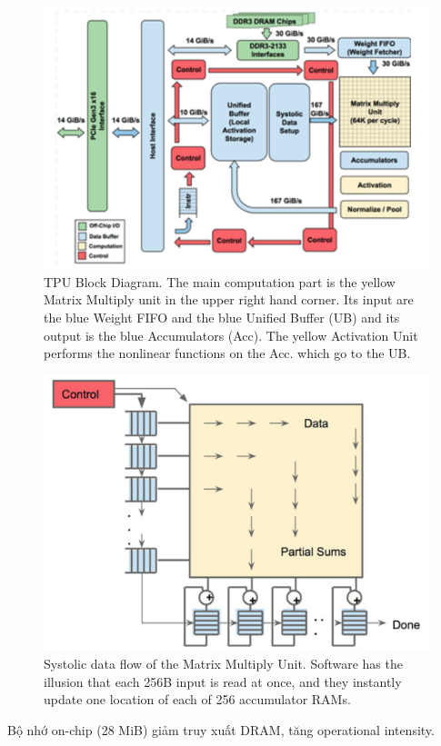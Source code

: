 \documentclass[a4paper]{article}
\begin{document}
\begin{figure}
    \centering
    \includegraphics[width=1\linewidth]{assets/tbu-block-diagram.png}
    \caption{TPU Block Diagram. The main computation part is the yellow Matrix Multiply unit in the upper right hand corner. Its input are the blue Weight FIFO and the blue Unified Buffer (UB) and its output is the blue Accumulators (Acc). The yellow Activation Unit performs the nonlinear functions on the Acc. which go to the UB.}
    \label{fig:enter-label}
\end{figure}

\begin{figure}
    \centering
    \includegraphics[width=0.75\linewidth]{assets/asic-f4.png}
    \caption{Systolic data flow of the Matrix Multiply Unit. Software has the illusion that each 256B input is read at once, and they instantly update one location of each of 256 accumulator RAMs.}
    \label{fig:enter-label}
\end{figure}
Bộ nhớ on-chip (28 MiB) giảm truy xuất DRAM, tăng operational intensity.
\end{document}
